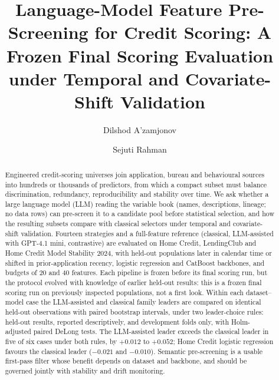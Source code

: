 \documentclass[final,5p,twocolumn]{elsarticle}
\begin{document}
\begin{frontmatter}

\title{Language-Model Feature Pre-Screening for Credit Scoring: A Frozen Final Scoring Evaluation under Temporal and Covariate-Shift Validation}

\author[aff1,aff3]{Dilshod A'zamjonov}

\author[aff2]{Sejuti Rahman}


\address[aff1]{Department of Engineering, New Uzbekistan University, 1 Movarounnahr Street, Mirzo Ulugbek District, Tashkent, Uzbekistan}
\address[aff2]{Department of Computing, New Uzbekistan University, 1 Movarounnahr Street, Mirzo Ulugbek District, Tashkent, Uzbekistan}
\address[aff3]{Central Bank of the Republic of Uzbekistan, 6 Islam Karimov Street, Tashkent 100001, Uzbekistan}

\begin{abstract}
Engineered credit-scoring universes join application, bureau and behavioural sources into hundreds or thousands of predictors, from which a compact subset must balance discrimination, redundancy, reproducibility and stability over time. We ask whether a large language model (LLM) reading the variable book (names, descriptions, lineage; no data rows) can pre-screen it to a candidate pool before statistical selection, and how the resulting subsets compare with classical selectors under temporal and covariate-shift validation. Fourteen strategies and a full-feature reference (classical, LLM-assisted with GPT-4.1 mini, contrastive) are evaluated on Home Credit, LendingClub and Home Credit Model Stability 2024, with held-out populations later in calendar time or shifted in prior-application recency, logistic regression and CatBoost backbones, and budgets of 20 and 40 features. Each pipeline is frozen before its final scoring run, but the protocol evolved with knowledge of earlier held-out results: this is a frozen final scoring run on previously inspected populations, not a first look. Within each dataset--model case the LLM-assisted and classical family leaders are compared on identical held-out observations with paired bootstrap intervals, under two leader-choice rules: held-out results, reported descriptively, and development folds only, with Holm-adjusted paired DeLong tests. The LLM-assisted leader exceeds the classical leader in five of six cases under both rules, by $+0.012$ to $+0.052$; Home Credit logistic regression favours the classical leader ($-0.021$ and $-0.010$). Semantic pre-screening is a usable first-pass filter whose benefit depends on dataset and backbone, and should be governed jointly with stability and drift monitoring.
\end{abstract}


\end{frontmatter}
\end{document}
